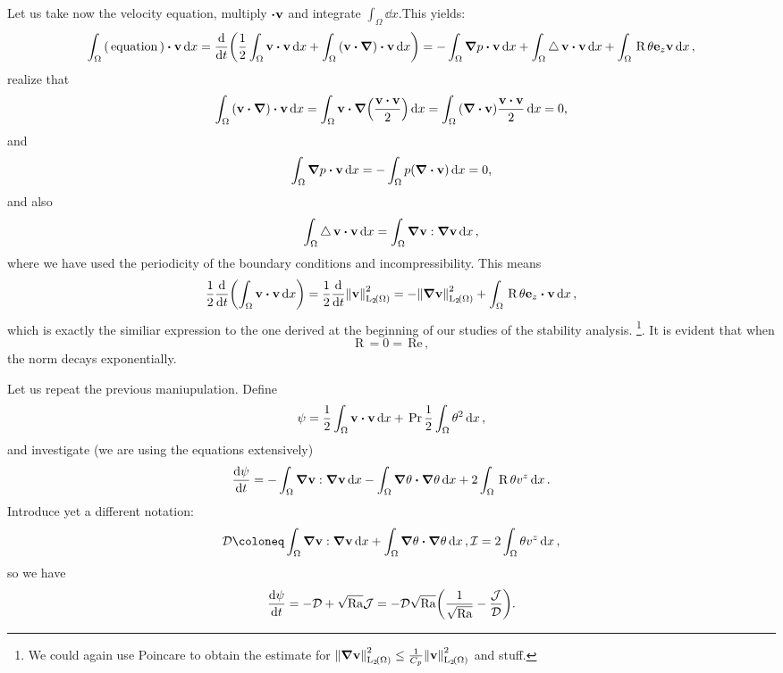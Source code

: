 \documentclass[reqno, a4paper]{article}
\begin{document}
Let us take now the velocity equation, multiply $\vdot \vb{v}$ and integrate $\int_{\Omega}\dd{x}$.This yields:
\[
	\int_{\Omega}\qty(\, \text{equation} \,) \vdot \vb{v}\dd{x} = \dv{t}\qty(\frac{1}{2}\int_{\Omega}\vb{v} \vdot \vb{v}\dd{x} + \int_{\Omega}\qty(\vb{v}\vdot \grad)\vdot \vb{v}\dd{x}) = - \int_{\Omega}\grad p \vdot \vb{v}\dd{x} + \int_{\Omega}\laplace \vb{v} \vdot \vb{v}\dd{x} + \int_{\Omega}\, \text{R} \,\theta \vb{e}_z \vb{v}\dd{x},
\]
realize that
\[
	\int_{\Omega}\qty(\vb{v}\vdot \grad) \vdot\vb{v}\dd{x} = \int_{\Omega}\vb{v}\vdot \grad\qty(\frac{\vb{v}\vdot \vb{v}}{2})\dd{x} = \int_{\Omega}\qty(\divergence{\vb{v}})\frac{\vb{v}\vdot \vb{v}}{2}\dd{x} = 0,
\]
and
\[
	\int_{\Omega}\grad p \vdot \vb{v}\dd{x} = - \int_{\Omega}p \qty(\divergence{\vb{v}})\dd{x} = 0,
\]
and also
\[
	\int_{\Omega}\laplace \vb{v}\vdot \vb{v}\dd{x} = \int_{\Omega}\grad \vb{v} : \grad\vb{v}\dd{x},
\]
where we have used the periodicity of the boundary conditions and incompressibility.
This means
\[
	\frac{1}{2} \dv{t}\qty(\int_{\Omega}\vb{v}\vdot \vb{v}\dd{x}) = \frac{1}{2} \dv{t} \norm{\vb{v}}_{\LpSet[2]{\Omega}}^{2} = - \norm{\grad \vb{v}}_{\LpSet[2]{\Omega}}^{2} + \int_{\Omega}\, \text{R} \, \theta \vb{e}_z \vdot \vb{v}\dd{x},
\]
which is exactly the similiar expression to the one derived at the beginning of our studies of the stability analysis. \footnote{We could again use Poincare to obtain the estimate for $\norm{\grad \vb{v}}_{\LpSet[2]{\Omega}}^{2} \leq \frac{1}{C_p} \norm{\vb{v}}_{\LpSet[2]{\Omega}}^{2}$ and stuff.}. It is evident that when
\[
	\, \text{R} \, = 0 = \, \text{Re} \,,
\]
the norm decays exponentially. 

Let us repeat the previous maniupulation. Define
\[
	\psi = \frac{1}{2}\int_{\Omega}\vb{v}\vdot \vb{v}\dd{x} + \, \text{Pr} \, \frac{1}{2} \int_{\Omega}\theta^{2}\dd{x},
\]
and investigate (we are using the equations extensively)
\[
	\dv{\psi}{t} = -\int_{\Omega}\grad \vb{v} : \grad \vb{v}\dd{x} - \int_{\Omega}\grad \theta \vdot \grad \theta\dd{x} + 2\int_{\Omega}\, \text{R} \, \theta v^z\dd{x}.
\]
Introduce yet a different notation:
\[
	\mathcal{D} \coloneq \int_{\Omega} \grad \vb{v}: \grad \vb{v}\dd{x} + \int_{\Omega}\grad \theta \vdot \grad \theta\dd{x}, \mathcal{I} = 2 \int_{\Omega}\theta v^z\dd{x},
\]
so we have
\[
	\dv{\psi}{t} = - \mathcal{D} + \sqrt{\mathrm{Ra}}\mathcal{J} = -\mathcal{D} \sqrt{\mathrm{Ra}}\qty(\frac{1}{\sqrt{\mathrm{Ra}}}-\frac{\mathcal{J}}{\mathcal{D}}).
\]
\end{document}
